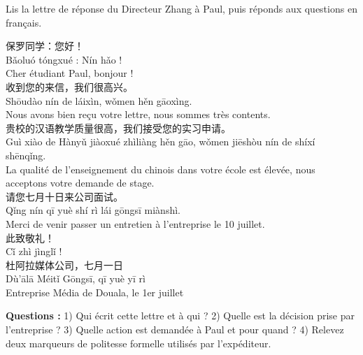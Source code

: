 \documentclass[11pt]{article}
\begin{document}
\begin{exercice}
Lis la lettre de réponse du Directeur Zhang à Paul, puis réponds aux questions en français.

\begin{textebox}
保罗同学：您好！\\
Bǎoluó tóngxué : Nín hǎo !\\
Cher étudiant Paul, bonjour !\\
收到您的来信，我们很高兴。\\
Shōudào nín de láixìn, wǒmen hěn gāoxìng.\\
Nous avons bien reçu votre lettre, nous sommes très contents.\\
贵校的汉语教学质量很高，我们接受您的实习申请。\\
Guì xiào de Hànyǔ jiàoxué zhìliàng hěn gāo, wǒmen jiēshòu nín de shíxí shēnqǐng.\\
La qualité de l'enseignement du chinois dans votre école est élevée, nous acceptons votre demande de stage.\\
请您七月十日来公司面试。\\
Qǐng nín qī yuè shí rì lái gōngsī miànshì.\\
Merci de venir passer un entretien à l'entreprise le 10 juillet.\\
此致敬礼！\\
Cǐ zhì jìnglǐ !\\
杜阿拉媒体公司，七月一日\\
Dù'ālā Méitǐ Gōngsī, qī yuè yī rì\\
Entreprise Média de Douala, le 1er juillet
\end{textebox}

\textbf{Questions :}
1) Qui écrit cette lettre et à qui ? 
2) Quelle est la décision prise par l'entreprise ? 
3) Quelle action est demandée à Paul et pour quand ? 
4) Relevez deux marqueurs de politesse formelle utilisés par l'expéditeur.
\end{exercice}
\end{document}
